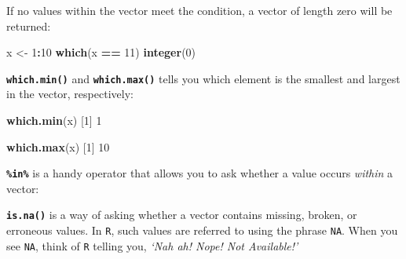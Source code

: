 \documentclass[
]{book}
\newenvironment{Shaded}{\begin{snugshade}}{\end{snugshade}}
\newcommand{\DecValTok}[1]{\textcolor[rgb]{0.00,0.00,0.81}{#1}}
\newcommand{\KeywordTok}[1]{\textcolor[rgb]{0.13,0.29,0.53}{\textbf{#1}}}
\newcommand{\NormalTok}[1]{#1}
\newcommand{\OperatorTok}[1]{\textcolor[rgb]{0.81,0.36,0.00}{\textbf{#1}}}
\newcommand{\OtherTok}[1]{\textcolor[rgb]{0.56,0.35,0.01}{#1}}
\newcommand{\StringTok}[1]{\textcolor[rgb]{0.31,0.60,0.02}{#1}}
\begin{document}
If no values within the vector meet the condition, a vector of length zero will be returned:

\begin{Shaded}
\begin{Highlighting}[]
\NormalTok{x <-}\StringTok{ }\DecValTok{1}\OperatorTok{:}\DecValTok{10}
\KeywordTok{which}\NormalTok{(x }\OperatorTok{==}\StringTok{ }\DecValTok{11}\NormalTok{)}
\KeywordTok{integer}\NormalTok{(}\DecValTok{0}\NormalTok{)}
\end{Highlighting}
\end{Shaded}

\textbf{\texttt{which.min()}} and \textbf{\texttt{which.max()}} tells you which element is the smallest and largest in the vector, respectively:

\begin{Shaded}
\begin{Highlighting}[]
\KeywordTok{which.min}\NormalTok{(x)}
\NormalTok{[}\DecValTok{1}\NormalTok{] }\DecValTok{1}
\end{Highlighting}
\end{Shaded}

\begin{Shaded}
\begin{Highlighting}[]
\KeywordTok{which.max}\NormalTok{(x)}
\NormalTok{[}\DecValTok{1}\NormalTok{] }\DecValTok{10}
\end{Highlighting}
\end{Shaded}

\textbf{\texttt{\%in\%}} is a handy operator that allows you to ask whether a value occurs \emph{within} a vector:

\begin{Shaded}
\end{Shaded}

\begin{Shaded}
\end{Shaded}

\textbf{\texttt{is.na()}} is a way of asking whether a vector contains missing, broken, or erroneous values. In \texttt{R}, such values are referred to using the phrase \texttt{NA}. When you see \texttt{NA}, think of \texttt{R} telling you, \emph{`Nah ah! Nope! Not Available!'}
\end{document}
